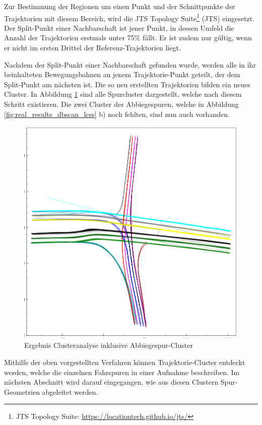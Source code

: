 Zur Bestimmung der Regionen um einen Punkt und der Schnittpunkte der Trajektorien mit diesem Bereich,
wird die JTS Topology Suite\footnote{JTS Topology Suite: \url{https://locationtech.github.io/jts/}}
(JTS) eingesetzt. Der Split-Punkt einer Nachbarschaft ist jener Punkt, in dessen Umfeld die Anzahl der
Trajektorien erstmals unter 75\% fällt. Er ist zudem nur gültig, wenn er nicht im ersten Drittel der
Referenz-Trajektorien liegt.

Nachdem der Split-Punkt einer Nachbarschaft gefunden wurde, werden alle in ihr beinhalteten Bewegungsbahnen
an jenem Trajektorie-Punkt geteilt, der dem Split-Punkt am nächsten ist.
Die so neu erstellten Trajektorien bilden ein neues Cluster. In Abbildung \ref{fig:real_turning_lane_result}
sind alle Spurcluster dargestellt, welche nach diesem Schritt existieren. Die zwei Cluster der Abbiegespuren,
welche in Abbildung \ref{fig:real_results_dbscan_lcss} b) noch fehlten, sind nun auch vorhanden.

\begin{figure}[H]
    \centering
    \includegraphics[width=0.35\linewidth]{resources/img/umsetzung/U1/clusters_with_turning_lanes}
    \caption{Ergebnis Clusteranalyse inklusive Abbiegespur-Cluster}
    \label{fig:real_turning_lane_result}
\end{figure}

Mithilfe der oben vorgestellten Verfahren können Trajektorie-Cluster entdeckt werden, welche
die einzelnen Fahrspuren in einer Aufnahme beschreiben. Im nächsten Abschnitt wird darauf eingegangen,
wie aus diesen Clustern Spur-Geometrien abgeleitet werden.